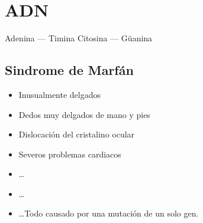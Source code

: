\section{ADN}

Adenina  --- Timina
Citosina --- Güanina

\subsection{Sindrome de Marfán}
\begin{itemize}
  \item Inusualmente delgados
  \item Dedos muy delgados de mano y pies
  \item Dislocación del cristalino ocular
  \item Severos problemas cardiacos
  \item \dots
  \item \dots
  \item \dots Todo causado por una mutación de un solo gen.
\end{itemize}
